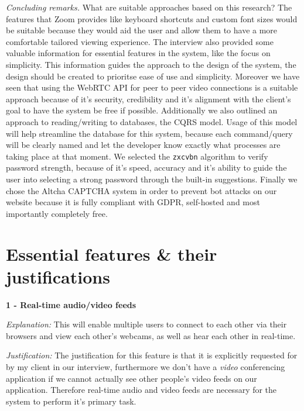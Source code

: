 \textit{Concluding remarks.}
What are suitable approaches based on this research?
The features that Zoom provides like keyboard shortcuts and 
custom font sizes would be suitable because they would aid the
user and allow them to have a more comfortable tailored 
viewing experience. The interview also provided some valuable 
information for essential features in the system, like the 
focus on simplicity. This information guides the approach to 
the design of the system, the design should be created to 
prioritse ease of use and simplicity. Moreover we have seen 
that using the WebRTC API for peer to peer video connections
is a suitable approach because of it's security, credibility
and it's alignment with the client's goal to have the system
be free if possible. Additionally we also outlined an 
approach to reading/writing to databases, the 
CQRS model. Usage of this model will help streamline the 
database for this system, because each command/query will be
clearly named and let the developer know exactly what 
processes are taking place at that moment. We selected
the \texttt{zxcvbn} algorithm to verify password strength, 
because of it's speed, accuracy and it's ability to guide the 
user into selecting a strong password through the built-in 
suggestions. Finally we chose the Altcha CAPTCHA system in 
order to prevent bot attacks on our website because it is 
fully compliant with GDPR, self-hosted and most importantly 
completely free.

\section{Essential features \& their justifications}
\label{sec:features}

\textsf{\bfseries 1 - Real-time audio/video feeds} \\ \vspace{0.1cm}

\textit{Explanation:} This will enable multiple users to 
connect to each other via their browsers and view each 
other's webcams, as well as hear
each other in real-time. \vspace{0.1cm}

\textit{Justification:} The justification for this feature is
that it is explicitly requested for by my client in our
interview, furthermore we don't have a \textit{video}
conferencing application if we cannot actually see other 
people's video feeds on our application. Therefore real-time
audio and video feeds are necessary for the system to perform
it's primary task.

